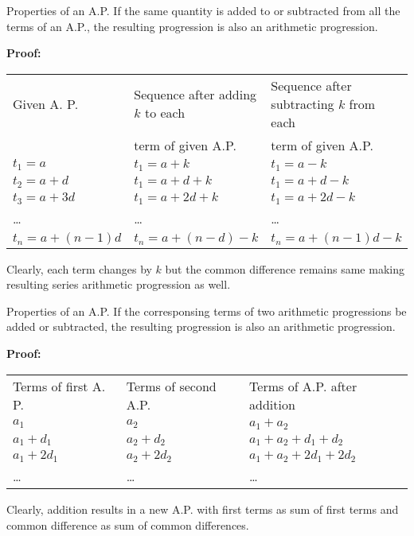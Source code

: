 \documentclass[aspectratio=1610,8pt]{beamer}
\begin{document}
\begin{frame}{Properties of an A.P.}
  If the same quantity is added to or subtracted from all the terms of an A.P.,
  the resulting progression is also an arithmetic progression.

  \textbf{Proof:}\\
  \begin{tabular}{lll}
    Given A. P. & Sequence after adding $k$ to each &
    Sequence after subtracting $k$ from each \\
    &term of given A.P.&term of given A.P.\\
    $t_1 = a$ & $t_1 = a + k$ & $t_1 = a - k$\\
    $t_2 = a + d$ & $t_1 = a + d + k$ & $t_1 = a + d - k$\\
    $t_3 = a + 3d$ & $t_1 = a + 2d + k$ & $t_1 = a + 2d - k$\\
    \ldots&\ldots & \ldots\\
    $t_n = a + (n - 1)d$ & $t_n = a + (n - d) - k$ & $t_n = a + (n - 1)d - k$
  \end{tabular}
  
  Clearly, each term changes by $k$ but the common difference remains same
  making resulting series arithmetic progression as well.
\end{frame}
\begin{frame}{Properties of an A.P.}
  If the corresponsing terms of two arithmetic progressions be added or
  subtracted, the resulting progression is also an arithmetic progression.

  \textbf{Proof:}\\
  \begin{tabular}{lll}
    Terms of first A. P.&Terms of second A.P.&Terms of A.P. after addition\\
    $a_1$&$a_2$&$a_1 + a_2$\\
    $a_1 + d_1$&$a_2 + d_2$&$a_1 + a_2 + d_1 + d_2$\\
    $a_1 + 2d_1$&$a_2 + 2d_2$&$a_1 + a_2 + 2d_1 + 2d_2$\\
    \ldots & \ldots & \ldots
  \end{tabular}

    Clearly, addition results in a new A.P. with first terms as sum of first
    terms and common difference as sum of common differences.
\end{frame}
\end{document}
